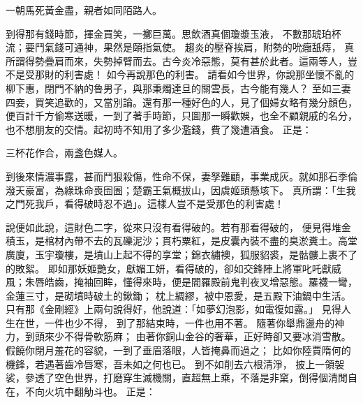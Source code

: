 \begin{showcontents}{}
一朝馬死黃金盡，親者如同陌路人。

到得那有錢時節，揮金買笑，一擲巨萬。思飲酒真個瓊漿玉液，
不數那琥珀杯流；要鬥氣錢可通神，果然是頤指氣使。
趨炎的壓脊挨肩，附勢的吮癰舐痔，
真所謂得勢疊肩而來，失勢掉臂而去。古今炎冷惡態，莫有甚於此者。這兩等人，豈不是受那財的利害處！
如今再說那色的利害。
請看如今世界，你說那坐懷不亂的柳下惠，閉門不納的魯男子，與那秉燭達旦的關雲長，古今能有幾人？
至如三妻四妾，買笑追歡的，又當別論。還有那一種好色的人，見了個婦女略有幾分顏色，便百計千方偷寒送暖，一到了著手時節，只圖那一瞬歡娛，也全不顧親戚的名分，也不想朋友的交情。起初時不知用了多少濫錢，費了幾遭酒食。
正是：

三杯花作合，兩盞色媒人。

到後來情濃事露，甚而鬥狠殺傷，性命不保，妻孥難顧，事業成灰。就如那石季倫潑天豪富，為綠珠命喪囹圄；楚霸王氣概拔山，因虞姬頭懸垓下。
真所謂：「生我之門死我戶，看得破時忍不過」。這樣人豈不是受那色的利害處！

說便如此說，這財色二字，從來只沒有看得破的。若有那看得破的，
便見得堆金積玉，是棺材內帶不去的瓦礫泥沙；貫朽粟紅，是皮囊內裝不盡的臭淤糞土。高堂廣廈，玉宇瓊樓，是墳山上起不得的享堂；錦衣繡襖，狐服貂裘，是骷髏上裹不了的敗絮。
即如那妖姬艷女，獻媚工妍，看得破的，卻如交鋒陣上將軍叱吒獻威風；朱唇皓齒，掩袖回眸，懂得來時，便是閻羅殿前鬼判夜叉增惡態。羅襪一彎，金蓮三寸，是砌墳時破土的鍬鋤；
枕上綢繆，被中恩愛，是五殿下油鍋中生活。
只有那《金剛經》上兩句說得好，他說道：「如夢幻泡影，如電復如露。」
見得人生在世，一件也少不得，
到了那結束時，一件也用不著。
隨著你舉鼎盪舟的神力，到頭來少不得骨軟筋麻；
由著你銅山金谷的奢華，正好時卻又要冰消雪散。
假饒你閉月羞花的容貌，一到了垂眉落眼，人皆掩鼻而過之；
比如你陸賈隋何的機鋒，若遇著齒冷唇寒，吾未如之何也已。
到不如削去六根清淨，
披上一領袈裟，參透了空色世界，打磨穿生滅機關，直超無上乘，不落是非窠，倒得個清閒自在，不向火坑中翻觔斗也。
正是：


\end{showcontents}
